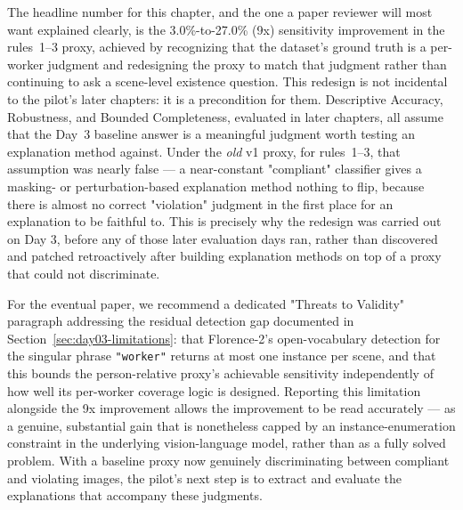 The headline number for this chapter, and the one a paper reviewer will most want explained
clearly, is the 3.0\%-to-27.0\% (9x) sensitivity improvement in the rules~1--3 proxy, achieved by
recognizing that the dataset's ground truth is a per-worker judgment and redesigning the proxy to
match that judgment rather than continuing to ask a scene-level existence question. This redesign
is not incidental to the pilot's later chapters: it is a precondition for them. Descriptive
Accuracy, Robustness, and Bounded Completeness, evaluated in later chapters, all assume that the
Day~3 baseline answer is a meaningful judgment worth testing an explanation method against. Under
the \emph{old} v1 proxy, for rules~1--3, that assumption was nearly false --- a near-constant
"compliant" classifier gives a masking- or perturbation-based explanation method nothing to flip,
because there is almost no correct "violation" judgment in the first place for an explanation to be
faithful to. This is precisely why the redesign was carried out on Day 3, before any of those later
evaluation days ran, rather than discovered and patched retroactively after building explanation
methods on top of a proxy that could not discriminate.

For the eventual paper, we recommend a dedicated "Threats to Validity" paragraph addressing the
residual detection gap documented in Section~\ref{sec:day03-limitations}: that Florence-2's
open-vocabulary detection for the singular phrase \texttt{"worker"} returns at most one instance per
scene, and that this bounds the person-relative proxy's achievable sensitivity independently of how
well its per-worker coverage logic is designed. Reporting this limitation alongside the 9x
improvement allows the improvement to be read accurately --- as a genuine, substantial gain that is
nonetheless capped by an instance-enumeration constraint in the underlying vision-language model,
rather than as a fully solved problem. With a baseline proxy now genuinely discriminating between
compliant and violating images, the pilot's next step is to extract and evaluate the explanations
that accompany these judgments.
